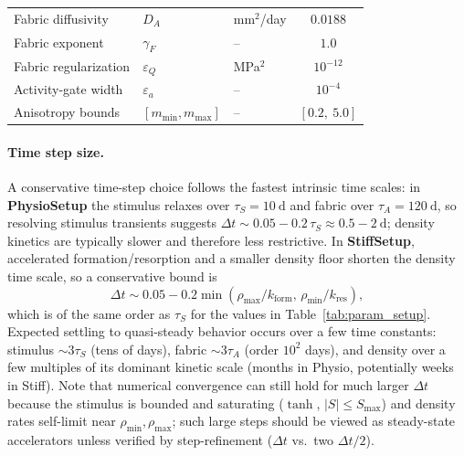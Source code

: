 \begin{table}[!htbp]
\begin{tabularx}{\textwidth}{@{} >{\raggedright\arraybackslash}X l l r r @{}}
    Fabric diffusivity & $D_A$ & mm$^2$/day & \multicolumn{2}{c}{$0.0188$} \\
    Fabric exponent & $\gamma_F$ & -- & \multicolumn{2}{c}{$1.0$} \\
    Fabric regularization & $\varepsilon_Q$ & MPa$^2$ & \multicolumn{2}{c}{$10^{-12}$} \\
    Activity-gate width & $\varepsilon_a$ & -- & \multicolumn{2}{c}{$10^{-4}$} \\
    Anisotropy bounds & $[m_{\min}, m_{\max}]$ & -- & \multicolumn{2}{c}{$[0.2, \ 5.0]$} \\
    \bottomrule
  \end{tabularx}
\end{table}

\paragraph{Time step size.}
A conservative time-step choice follows the fastest intrinsic time scales: in \textbf{PhysioSetup} the stimulus relaxes over $\tau_S=10~\mathrm{d}$ and fabric over $\tau_A=120~\mathrm{d}$, so resolving stimulus transients suggests $\Delta t \sim 0.05\!-\!0.2\,\tau_S \approx 0.5\!-\!2~\mathrm{d}$; density kinetics are typically slower and therefore less restrictive.
In \textbf{StiffSetup}, accelerated formation/resorption and a smaller density floor shorten the density time scale, so a conservative bound is
\[
\Delta t \sim 0.05\!-\!0.2\min(\rho_{\max}/k_{\mathrm{form}},\,\rho_{\min}/k_{\mathrm{res}}),
\]
which is of the same order as $\tau_S$ for the values in Table~\ref{tab:param_setup}.
Expected settling to quasi-steady behavior occurs over a few time constants: stimulus $\sim 3\tau_S$ (tens of days), fabric $\sim 3\tau_A$ (order $10^2$ days), and density over a few multiples of its dominant kinetic scale (months in Physio, potentially weeks in Stiff).
Note that numerical convergence can still hold for much larger $\Delta t$ because the stimulus is bounded and saturating ($\tanh$, $|S|\le S_{\max}$) and density rates self-limit near $\rho_{\min},\rho_{\max}$; such large steps should be viewed as steady-state accelerators unless verified by step-refinement ($\Delta t$ vs.\ two $\Delta t/2$).

